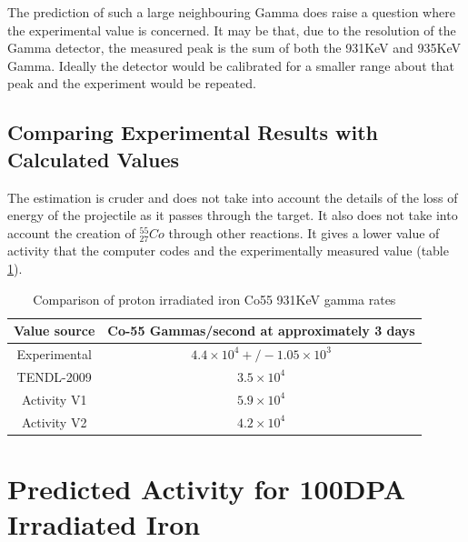 The prediction of such a large neighbouring Gamma does raise a question where the experimental value is concerned.  It may be that, due to the resolution of the Gamma detector, the measured peak is the sum of both the 931KeV and 935KeV Gamma.  Ideally the detector would be calibrated for a smaller range about that peak and the experiment would be repeated.
 

\subsection{Comparing Experimental Results with Calculated Values}

The estimation is cruder and does not take into account the details of the loss of energy of the projectile as it passes through the target.  It also does not take into account the creation of ${}^{55}_{27} Co$ through other reactions.  It gives a lower value of activity that the computer codes and the experimentally measured value (table \ref{table:activityResultsCompared}).

\begin{table}[h]
\begin{center}
\begin{tabular}{c c}
\hline\hline
Value source & Co-55 Gammas/second at approximately 3 days \\
\hline\hline
Experimental & $4.4\times10^4 +/- 1.05 \times 10^3$ \\
TENDL-2009 & $3.5\times10^4$ \\
Activity V1 & $5.9\times10^4$ \\
Activity V2 & $4.2\times10^4$ \\
\hline\hline
\end{tabular}
\end{center}
\caption{Comparison of proton irradiated iron Co55 931KeV gamma rates}
\label{table:activityResultsCompared}
\end{table}






\FloatBarrier


\section[100DPA Predicted Activity]{Predicted Activity for 100DPA Irradiated Iron}

